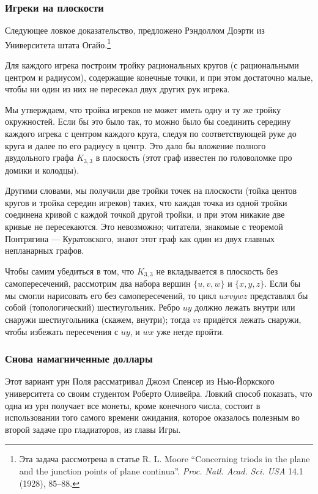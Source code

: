 \subsubsection*{Игреки на плоскости}

Следующее ловкое  доказательство, предложено Рэндоллом Доэрти из Университета штата Огайо.\footnote{Эта задача рассмотрена в статье R. L. Moore  ``Concerning triods in the plane and the junction points of plane continua''. \emph{Proc. Natl. Acad. Sci. USA} 14.1 (1928), 85--88.}

\medskip

Для каждого игрека построим тройку рациональных кругов (с рациональными центром и радиусом), содержащие конечные точки, и при этом достаточно малые, чтобы ни один из них не пересекал двух других рук игрека.

Мы утверждаем, что тройка игреков не может иметь одну и ту же тройку окружностей.
Если бы это было так, то можно было бы соединить середину каждого игрека с центром каждого круга, следуя по соответствующей руке до круга и далее по его радиусу в центр.
Это дало бы вложение полного двудольного графа $K_{3,3}$ в плоскость (этот граф известен по головоломке про домики и колодцы).

Другими словами, мы получили две тройки точек на плоскости (тойка центов кругов и тройка середин игреков) таких, что каждая точка из одной тройки соединена кривой с каждой точкой другой тройки, и при этом никакие две кривые не пересекаются.
Это невозможно; читатели, знакомые с теоремой Понтрягина --- Куратовского, знают этот граф как один из двух главных непланарных графов.

Чтобы самим убедиться в том, что $K_{3,3}$ не вкладывается в плоскость без самопересечений, рассмотрим два набора вершин $\{u, v, w\}$ и $\{x, y, z\}$.
Если бы мы смогли нарисовать его без самопересечений, то цикл $uxvywz$ представлял бы  собой (топологический) шестиугольник.
Ребро $uy$ должно лежать внутри или снаружи шестиугольника (скажем, внутри);
тогда $vz$ придётся лежать снаружи, чтобы избежать пересечения с $uy$, и $wx$ уже негде пройти.
\heart

\subsubsection*{Снова  намагниченные доллары}

Этот вариант урн Поля рассматривал Джоэл Спенсер из Нью-Йоркского университета со своим студентом Роберто Оливейра.
Ловкий способ показать, что одна из урн получает все монеты, кроме конечного числа, состоит в использовании того самого времени ожидания, которое оказалось полезным во второй задаче про гладиаторов, из главы Игры.

